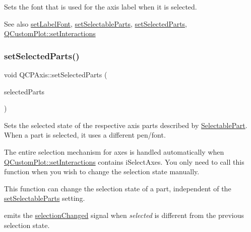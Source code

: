 Sets the font that is used for the axis label when it is selected.

\begin{DoxySeeAlso}{See also}
\mbox{\hyperlink{class_q_c_p_axis_a71ac1a47f7547e490a8c4311d1433cf3}{set\+Label\+Font}}, \mbox{\hyperlink{class_q_c_p_axis_a513f9b9e326c505d9bec54880031b085}{set\+Selectable\+Parts}}, \mbox{\hyperlink{class_q_c_p_axis_ab9d7a69277dcbed9119b3c1f25ca19c3}{set\+Selected\+Parts}}, \mbox{\hyperlink{class_q_custom_plot_a5ee1e2f6ae27419deca53e75907c27e5}{Q\+Custom\+Plot\+::set\+Interactions}} 
\end{DoxySeeAlso}
\mbox{\label{class_q_c_p_axis_ab9d7a69277dcbed9119b3c1f25ca19c3}} 
\subsubsection{\texorpdfstring{setSelectedParts()}{setSelectedParts()}}
{\footnotesize\ttfamily void Q\+C\+P\+Axis\+::set\+Selected\+Parts (\begin{DoxyParamCaption}\item[{const Q\+C\+P\+Axis\+::\+Selectable\+Parts \&}]{selected\+Parts }\end{DoxyParamCaption})}

Sets the selected state of the respective axis parts described by \mbox{\hyperlink{class_q_c_p_axis_abee4c7a54c468b1385dfce2c898b115f}{Selectable\+Part}}. When a part is selected, it uses a different pen/font.

The entire selection mechanism for axes is handled automatically when \mbox{\hyperlink{class_q_custom_plot_a5ee1e2f6ae27419deca53e75907c27e5}{Q\+Custom\+Plot\+::set\+Interactions}} contains i\+Select\+Axes. You only need to call this function when you wish to change the selection state manually.

This function can change the selection state of a part, independent of the \mbox{\hyperlink{class_q_c_p_axis_a513f9b9e326c505d9bec54880031b085}{set\+Selectable\+Parts}} setting.

emits the \mbox{\hyperlink{class_q_c_p_axis_a62b598abeee7174a05f9d542cc85b1f5}{selection\+Changed}} signal when {\itshape selected} is different from the previous selection state.


